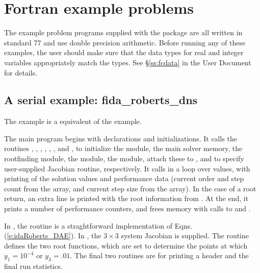 \section{Fortran example problems}\label{s:ex_fortran}

The {\F} example problem programs supplied with the {\ida}
package are all written in standard {\F}77 and use double precision
arithmetic.  Before running any of these examples, the user should
make sure that the {\F} data types for real and integer variables
appropriately match the {\CC} types.  See \S\ref{ss:fcdata} in the
{\ida} User Document for details.

\subsection{A serial example: fida\_roberts\_dns}\label{ss:fidaRoberts}

The  example is a {\F} equivalent of the
 example.

The main program begins with declarations and initializations.  
It calls the routines , , , 
, , , and
, to initialize the {\nvecs} module, the main
solver memory, the rootfinding module, the {\sunmatdense} module, the
{\sunlinsoldense} module, attach these to {\ida}, and to specify
user-supplied Jacobian routine, respectively. 
It calls  in a loop over  values, with printing of
the solution values and performance data (current order and step count
from the  array, and current step size from the  array).
In the case of a root return, an extra line is printed with the root
information from .  At the end, it prints a number of
performance counters, and frees memory with calls to 
and .

In , the  routine is a straghtforward
implementation of Eqns. (\ref{e:idaRoberts_DAE}).  In , the 
$3 \times 3$ system Jacobian is supplied.  The  routine
defines the two root functions, which are set to determine the points at which
$y_1 = 10^{-4}$ or $y_3 = .01$.  The final two routines are for
printing a header and the final run statistics.

